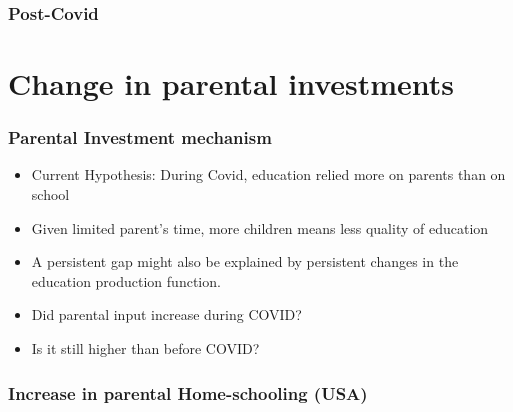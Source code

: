 \documentclass{beamer}
\begin{document}
\begin{frame}
    \label{update_scott}
    \frametitle{Post-Covid}
 {
    }
\end{frame}


\section{Change in parental investments}


\begin{frame}
    \frametitle{Parental Investment mechanism}
    \begin{itemize}
        \item Current Hypothesis: During Covid, education relied more on parents than on school
        \item Given limited parent's time, more children means less quality of education
        \item A persistent gap might also be explained by persistent changes in the education production function. 
        \item Did parental input increase during COVID? 
        \item Is it still higher than before COVID?
    \end{itemize}
\end{frame}

\begin{frame}
    \label{update_scott}
    \frametitle{Increase in parental Home-schooling (USA)}
        {
    }
\end{frame}
\end{document}
